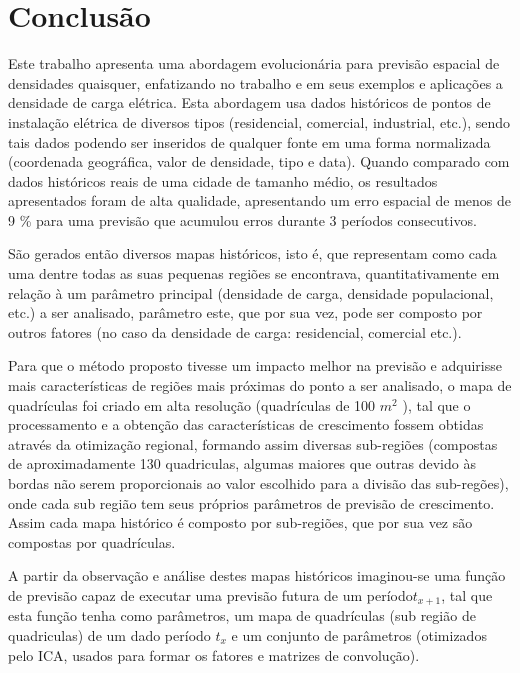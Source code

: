 \chapter{Conclusão}
\label{conclusao}

Este trabalho apresenta uma abordagem evolucionária para previsão espacial de densidades quaisquer, enfatizando no trabalho e em seus exemplos e aplicações a densidade de carga elétrica. Esta abordagem usa dados históricos de pontos de instalação elétrica de diversos tipos (residencial, comercial, industrial, etc.), sendo tais dados podendo ser inseridos de qualquer fonte em uma forma normalizada (coordenada geográfica, valor de densidade, tipo e  data). Quando comparado com dados históricos reais de uma cidade de tamanho médio, os resultados apresentados foram de alta qualidade, apresentando um erro espacial de menos de 9 \% para uma previsão que acumulou erros durante 3 períodos consecutivos. 

São gerados então diversos mapas históricos, isto é, que representam como cada uma dentre todas as suas pequenas regiões se encontrava, quantitativamente em relação à um parâmetro principal (densidade de carga, densidade populacional, etc.) a ser analisado, parâmetro este, que por sua vez, pode ser composto por outros fatores (no caso da densidade de carga: residencial, comercial etc.). 

Para que o método proposto tivesse um impacto melhor na previsão e adquirisse mais características de regiões mais próximas do ponto a ser analisado, o mapa de quadrículas foi criado em alta resolução (quadrículas de 100 \(m^2\) ), tal que o processamento e a obtenção das características de crescimento fossem obtidas através da otimização regional, formando assim diversas sub-regiões (compostas de aproximadamente 130 quadriculas, algumas maiores que outras devido às bordas não serem proporcionais ao valor escolhido para a divisão das sub-regões), onde cada sub região tem seus próprios parâmetros de previsão de crescimento. Assim cada mapa histórico é composto por sub-regiões, que por sua vez são compostas por quadrículas.  
 
A partir da observação e análise destes mapas históricos imaginou-se uma função de previsão capaz de executar uma previsão futura de um período\(t_{x+1}\), tal que esta função tenha como parâmetros, um mapa de quadrículas (sub região de quadriculas) de um dado período \(t_{x}\) e um conjunto de parâmetros (otimizados pelo ICA, usados para formar os fatores e matrizes de convolução).  

